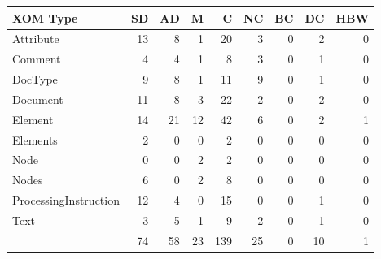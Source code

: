 \begin{tabular}{|l|r|r|r|r|r|r|r|r|}\hline
XOM Type & SD & AD & M & C & NC & BC & DC & HBW\\\hline\hline
Attribute & 13 & 8 & 1 & 20 & 3 & 0 & 2 & 0\\\hline
Comment & 4 & 4 & 1 & 8 & 3 & 0 & 1 & 0\\\hline
DocType & 9 & 8 & 1 & 11 & 9 & 0 & 1 & 0\\\hline
Document & 11 & 8 & 3 & 22 & 2 & 0 & 2 & 0\\\hline
Element & 14 & 21 & 12 & 42 & 6 & 0 & 2 & 1\\\hline
Elements & 2 & 0 & 0 & 2 & 0 & 0 & 0 & 0\\\hline
Node & 0 & 0 & 2 & 2 & 0 & 0 & 0 & 0\\\hline
Nodes & 6 & 0 & 2 & 8 & 0 & 0 & 0 & 0\\\hline
ProcessingInstruction & 12 & 4 & 0 & 15 & 0 & 0 & 1 & 0\\\hline
Text & 3 & 5 & 1 & 9 & 2 & 0 & 1 & 0\\\hline
\hline
 & 74 & 58 & 23 & 139 & 25 & 0 & 10 & 1\\\hline
\end{tabular}
